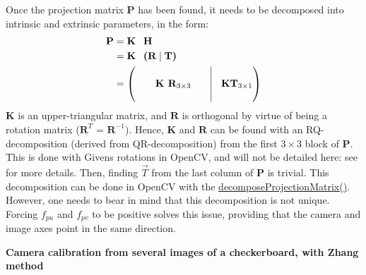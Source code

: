 \newpage
Once the projection matrix $\textbf{P}$ has been found, it needs to be decomposed into intrinsic and extrinsic parameters, in the form:
\begin{equation} 
  \begin{aligned}
      \textbf{P} &= \textbf{K \ H} \\
                 &= \textbf{K \ (R\ \vline \ T)} \\
                 &= \begin{pmatrix}& & & &\vline & \\ && \textbf{K R}_{3\times 3} & & \vline & \textbf{KT}_{3\times 1}\\ &&&&\vline&\end{pmatrix}
  \end{aligned}
\end{equation}   
$\textbf{K}$ is an upper-triangular matrix, and $\textbf{R}$ is orthogonal by virtue of being a rotation matrix ($\textbf{R}^T$ = $\textbf{R}^{-1}$). Hence, $\textbf{K}$ and $\textbf{R}$ can be found with an RQ-decomposition (derived from QR-decomposition) from the first $3 \times 3$ block of $\textbf{P}$. This is done with Givens rotations in OpenCV, and will not be detailed here: see \cite{Bradski2000, Hartley2003} for more details. Then, finding $\overrightarrow{T}$ from the last column of $\textbf{P}$ is trivial. This decomposition can be done in OpenCV with the \href{https://docs.opencv.org/4.x/d9/d0c/group__calib3d.html#gaaae5a7899faa1ffdf268cd9088940248}{decomposeProjectionMatrix()}. However, one needs to bear in mind that this decomposition is not unique. Forcing $f_{pu}$ and $f_{pv}$ to be positive solves this issue, providing that the camera and image axes point in the same direction.

\vspace*{0.5cm}
\noindent\textbf{Camera calibration from several images of a checkerboard, with Zhang method} 

